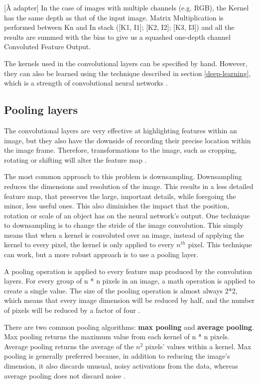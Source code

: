 \documentclass[12pt,a4paper,notitlepage]{article}
\begin{document}
[À adapter] In the case of images with multiple channels (e.g. RGB), the Kernel has the same depth as that of the input image. Matrix Multiplication is performed between Kn and In stack ([K1, I1]; [K2, I2]; [K3, I3]) and all the results are summed with the bias to give us a squashed one-depth channel Convoluted Feature Output.

The kernels used in the convolutional layers can be specified by hand. However, they can also be learned using the technique described in section \ref{deep-learning}, which is a strength of convolutional neural networks \cite{brownlee_gentle_2019}.

\subsection{Pooling layers}
The convolutional layers are very effective at highlighting features within an image, but they also have the downside of recording their precise location within the image frame. Therefore, transformations to the image, such as cropping, rotating or shifting will alter the feature map \cite{brownlee_gentle_2019}.

The most common approach to this problem is downsampling. Downsampling reduces the dimensions and resolution of the image. This results in a less detailed feature map, that preserves the large, important details, while foregoing the minor, less useful ones. This also diminishes the impact that the position, rotation or scale of an object has on the neural network's output. One technique to downsampling is to change the stride of the image convolution. This simply means that when a kernel is convoluted over an image, instead of applying the kernel to every pixel, the kernel is only applied to every \(n^{th}\) pixel. This technique can work, but a more robust approach is to use a pooling layer.

A pooling operation is applied to every feature map produced by the convolution layers. For every group of n * n pixels in an image, a math operation is applied to create a single value. The size of the pooling operation is almost always 2*2, which means that every image dimension will be reduced by half, and the number of pixels will be reduced by a factor of four \cite{brownlee_gentle_2019}.

There are two common pooling algorithms: \textbf{max pooling} and \textbf{average pooling}. Max pooling returns the maximum value from each kernel of n * n pixels. Average pooling returns the average of the \(n^2\) pixels' values within a kernel. Max pooling is generally preferred because, in addition to reducing the image's dimension, it also discards unusual, noisy activations from the data, whereas average pooling does not discard noise \cite{saha_comprehensive_2018}.
\end{document}
